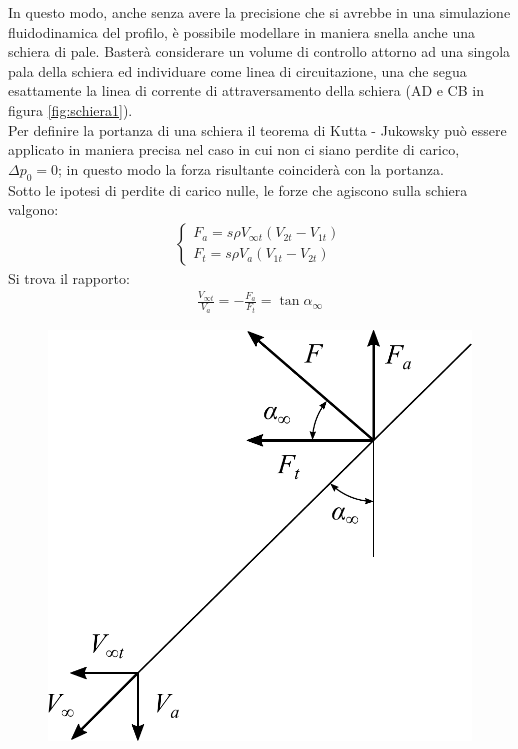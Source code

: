 In questo modo, anche senza avere la precisione che si avrebbe in una simulazione fluidodinamica del profilo, è possibile modellare in maniera snella anche una schiera di pale. Basterà considerare un volume di controllo attorno ad una singola pala della schiera ed individuare come linea di circuitazione, una che segua esattamente la linea di corrente di attraversamento della schiera (AD e CB in figura \ref{fig:schiera1}).\\
Per definire la portanza di una schiera il teorema di Kutta - Jukowsky può essere applicato in maniera precisa nel caso in cui non ci siano perdite di carico, $\Delta p_0=0$; in questo modo la forza risultante coinciderà con la portanza.\\
Sotto le ipotesi di perdite di carico nulle, le forze che agiscono sulla schiera valgono:
\begin{align*}
\begin{cases}
F_a = s \rho V_{\infty t} (V_{2t}-V_{1t})\\
F_t = s \rho V_a (V_{1t}-V_{2t})
\end{cases}
\end{align*}
Si trova il rapporto:
\begin{align*}
	\frac{V_{\infty t}}{V_a}=-\frac{F_a}{F_t} = \tan \alpha_{\infty}
\end{align*}
\begin{figure}
	\centering
	\begin{minipage}{.4\textwidth}
		\centering
		\includegraphics[width=.95\linewidth]{fig/forzaKJ.pdf}
		\label{fig:forzaKJ}
	\end{minipage}
\end{figure}
